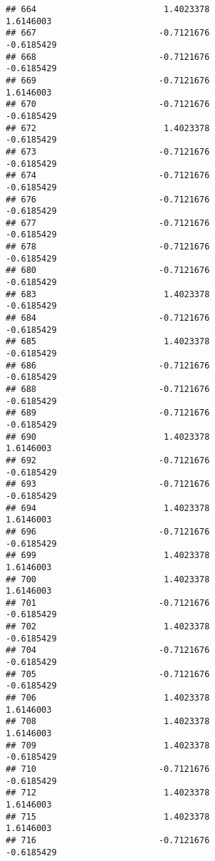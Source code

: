 \documentclass[
]{article}
\begin{document}
\begin{verbatim}
## 664                         1.4023378                        1.6146003
## 667                        -0.7121676                       -0.6185429
## 668                        -0.7121676                       -0.6185429
## 669                        -0.7121676                        1.6146003
## 670                        -0.7121676                       -0.6185429
## 672                         1.4023378                       -0.6185429
## 673                        -0.7121676                       -0.6185429
## 674                        -0.7121676                       -0.6185429
## 676                        -0.7121676                       -0.6185429
## 677                        -0.7121676                       -0.6185429
## 678                        -0.7121676                       -0.6185429
## 680                        -0.7121676                       -0.6185429
## 683                         1.4023378                       -0.6185429
## 684                        -0.7121676                       -0.6185429
## 685                         1.4023378                       -0.6185429
## 686                        -0.7121676                       -0.6185429
## 688                        -0.7121676                       -0.6185429
## 689                        -0.7121676                       -0.6185429
## 690                         1.4023378                        1.6146003
## 692                        -0.7121676                       -0.6185429
## 693                        -0.7121676                       -0.6185429
## 694                         1.4023378                        1.6146003
## 696                        -0.7121676                       -0.6185429
## 699                         1.4023378                        1.6146003
## 700                         1.4023378                        1.6146003
## 701                        -0.7121676                       -0.6185429
## 702                         1.4023378                       -0.6185429
## 704                        -0.7121676                       -0.6185429
## 705                        -0.7121676                       -0.6185429
## 706                         1.4023378                        1.6146003
## 708                         1.4023378                        1.6146003
## 709                         1.4023378                       -0.6185429
## 710                        -0.7121676                       -0.6185429
## 712                         1.4023378                        1.6146003
## 715                         1.4023378                        1.6146003
## 716                        -0.7121676                       -0.6185429

\end{verbatim}
\end{document}

